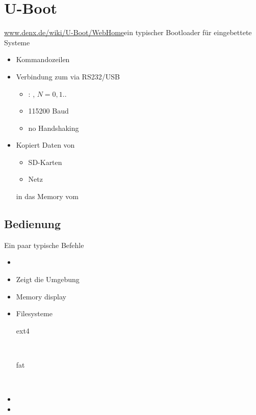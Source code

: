 \section{U-Boot}
\begin{frame}{\url{www.denx.de/wiki/U-Boot/WebHome}}{ein typischer Bootloader für eingebettete Systeme}
 \begin{itemize}
  \item Kommandozeilen
  \item Verbindung zum \host via RS232/USB
  \begin{itemize}
   \item \host: , $N=0,1..$
   \item 115200 Baud 
   \item {\Large no} Handshaking
  \end{itemize}
  \item Kopiert Daten von
  \begin{itemize}
   \item SD-Karten
   \item Netz
  \end{itemize}
  in das Memory vom \targetS
 \end{itemize}
\end{frame}

\subsection{Bedienung}
\begin{frame}{Ein paar typische Befehle}
 \begin{itemize}
  \item {}
  \item {} Zeigt die Umgebung
  \item {} Memory display
  \item Filesysteme 
  \begin{description}
   \item[ext4] \\
   \item[fat] \\
  \end{description}
  \item {} 
  \item {}
 \end{itemize}
\end{frame}


